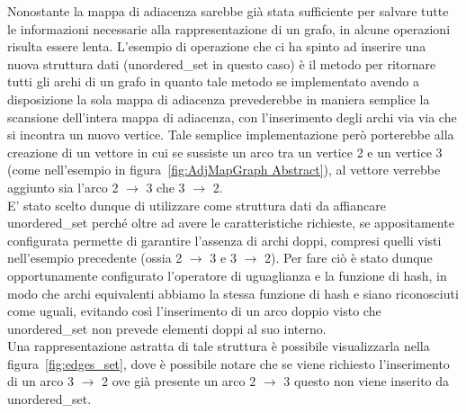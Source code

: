 Nonostante la mappa di adiacenza sarebbe già stata sufficiente per salvare tutte le informazioni necessarie alla rappresentazione di un grafo, in alcune operazioni risulta essere lenta. L'esempio di operazione che ci ha spinto ad inserire una nuova struttura dati (unordered\_set in questo caso) è il metodo per ritornare tutti gli archi di un grafo in quanto tale metodo se implementato avendo a disposizione la sola mappa di adiacenza prevederebbe in maniera semplice la scansione dell'intera mappa di adiacenza, con l'inserimento degli archi via via che si incontra un nuovo vertice. Tale semplice implementazione però porterebbe alla creazione di un vettore in cui se sussiste un arco tra un vertice 2 e un vertice 3 (come nell'esempio in figura~\ref{fig:AdjMapGraph Abstract}), al vettore verrebbe aggiunto sia l'arco 2 $\rightarrow$ 3 che 3 $\rightarrow$ 2. \\



E' stato scelto dunque di utilizzare come struttura dati da affiancare unordered\_set perché oltre ad avere le caratteristiche richieste, se appositamente configurata permette di garantire l'assenza di archi doppi, compresi quelli visti nell'esempio precedente (ossia 2 $\rightarrow$ 3 e 3 $\rightarrow$ 2). Per fare ciò è stato dunque opportunamente configurato l'operatore di uguaglianza e la funzione di hash, in  modo che archi equivalenti abbiamo la stessa funzione di hash e siano riconosciuti come uguali, evitando così l'inserimento di un arco doppio visto che  unordered\_set non prevede elementi doppi al suo interno.\\

Una rappresentazione astratta di tale struttura è possibile visualizzarla nella figura~\ref{fig:edges_set}, dove è possibile notare che se viene richiesto l'inserimento di un arco 3 $\rightarrow$ 2 ove già presente un arco 2 $\rightarrow$ 3 questo non viene inserito da unordered\_set.\\

